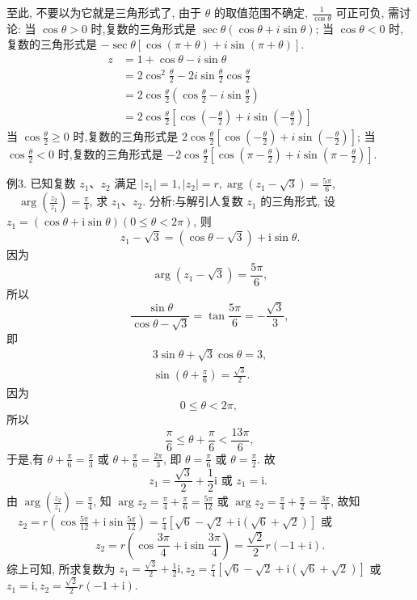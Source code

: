 至此, 不要以为它就是三角形式了, 由于 $\theta$ 的取值范围不确定, $\frac{1}{\cos \theta}$ 可正可负, 需讨论:
当 $\cos \theta>0$ 时,复数的三角形式是 $\sec \theta(\cos \theta+i \sin \theta)$;
当 $\cos \theta<0$ 时,复数的三角形式是 $-\sec \theta[\cos (\pi+\theta)+i \sin (\pi+\theta)]$.
$$
\begin{aligned}
z & =1+\cos \theta-i \sin \theta \\
& =2 \cos ^2 \frac{\theta}{2}-2 i \sin \frac{\theta}{2} \cos \frac{\theta}{2} \\
& =2 \cos \frac{\theta}{2}\left(\cos \frac{\theta}{2}-i \sin \frac{\theta}{2}\right) \\
& =2 \cos \frac{\theta}{2}\left[\cos \left(-\frac{\theta}{2}\right)+i \sin \left(-\frac{\theta}{2}\right)\right]
\end{aligned}
$$
当 $\cos \frac{\theta}{2} \geqslant 0$ 时,复数的三角形式是 $2 \cos \frac{\theta}{2}\left[\cos \left(-\frac{\theta}{2}\right)+i \sin \left(-\frac{\theta}{2}\right)\right]$;
当 $\cos \frac{\theta}{2}<0$ 时,复数的三角形式是 $-2 \cos \frac{\theta}{2}\left[\cos \left(\pi-\frac{\theta}{2}\right)+i \sin \left(\pi-\frac{\theta}{2}\right)\right]$.



例3. 已知复数 $z_1 、 z_2$ 满足 $\left|z_1\right|=1,\left|z_2\right|=r, \arg \left(z_1-\sqrt{3}\right)=\frac{5 \pi}{6}$,
$\quad \arg \left(\frac{z_2}{z_1}\right)=\frac{\pi}{4}$, 求 $z_1 、 z_2$.
分析:与解引人复数 $z_1$ 的三角形式, 设 $z_1=(\cos \theta+\mathrm{i} \sin \theta)(0 \leqslant \theta<2 \pi)$, 则
$$
z_1-\sqrt{3}=(\cos \theta-\sqrt{3})+\mathrm{i} \sin \theta .
$$
因为
$$
\arg \left(z_1-\sqrt{3}\right)=\frac{5 \pi}{6},
$$
所以
$$
\frac{\sin \theta}{\cos \theta-\sqrt{3}}=\tan \frac{5 \pi}{6}=-\frac{\sqrt{3}}{3},
$$
即
$$
\begin{gathered}
3 \sin \theta+\sqrt{3} \cos \theta=3, \\
\sin \left(\theta+\frac{\pi}{6}\right)=\frac{\sqrt{3}}{2} .
\end{gathered}
$$
因为
$$
0 \leqslant \theta<2 \pi \text {, }
$$
所以
$$
\frac{\pi}{6} \leqslant \theta+\frac{\pi}{6}<\frac{13 \pi}{6},
$$
于是,有
$\theta+\frac{\pi}{6}=\frac{\pi}{3}$ 或 $\theta+\frac{\pi}{6}=\frac{2 \pi}{3}$,
即
$\theta=\frac{\pi}{6}$ 或 $\theta=\frac{\pi}{2}$.
故
$$
z_1=\frac{\sqrt{3}}{2}+\frac{1}{2} \mathrm{i} \text { 或 } z_1=\mathrm{i} \text {. }
$$
由 $\arg \left(\frac{z_2}{z_1}\right)=\frac{\pi}{4}$, 知
$\arg z_2=\frac{\pi}{4}+\frac{\pi}{6}=\frac{5 \pi}{12}$ 或 $\arg z_2=\frac{\pi}{4}+\frac{\pi}{2}=\frac{3 \pi}{4}$,
故知 $\quad z_2=r\left(\cos \frac{5 \pi}{12}+\mathrm{i} \sin \frac{5 \pi}{12}\right)=\frac{r}{4}[\sqrt{6}-\sqrt{2}+\mathrm{i}(\sqrt{6}+\sqrt{2})]$
或
$$
z_2=r\left(\cos \frac{3 \pi}{4}+\mathrm{i} \sin \frac{3 \pi}{4}\right)=\frac{\sqrt{2}}{2} r(-1+\mathrm{i}) .
$$
综上可知, 所求复数为 $z_1=\frac{\sqrt{3}}{2}+\frac{1}{2} \mathrm{i}, z_2=\frac{r}{4}[\sqrt{6}-\sqrt{2}+\mathrm{i}(\sqrt{6}+\sqrt{2})]$ 或 $z_1=\mathrm{i}, z_2=\frac{\sqrt{2}}{2} r(-1+\mathrm{i})$.



